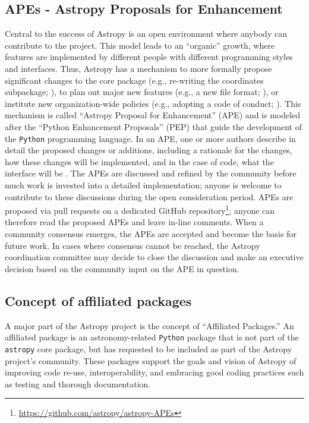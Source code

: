 \documentclass[modern]{aastex62}
\newcommand{\package}[1]{\texttt{#1}\xspace}
\newcommand{\python}{\package{Python}}
\newcommand{\astropy}{Astropy\xspace}
\newcommand{\astropypkg}{\package{astropy}}
\begin{document}
\subsection{APEs - Astropy Proposals for Enhancement}
\label{sect:ape}
Central to the success of \astropy is an open environment where anybody can
contribute to the project.
This model leads to an ``organic'' growth, where features are
implemented by different people with different programming styles and
interfaces.
Thus, \astropy has a mechanism to more formally propose significant changes to
the core package (e.g., re-writing the coordinates subpackage; \citealt{ape5}),
to plan out major new features (e.g., a new file format; \citealt{ape6}), or
institute new organization-wide policies (e.g., adopting a code of conduct;
\citealt{ape8}).
This mechanism is called ``Astropy Proposal for Enhancement'' (APE) and is
modeled after the ``Python Enhancement Proposals'' (PEP) that guide the
development of the \python programming language.
In an APE, one or more authors describe in detail the proposed changes or
additions, including a rationale for the changes, how these changes will be
implemented, and in the case of code, what the interface will be \citep{ape1}.
The APEs are discussed and refined by the community before much work is invested
into a detailed implementation; anyone is welcome to contribute to these
discussions during the open consideration period. APEs are proposed via pull
requests on a dedicated GitHub repository\footnote{\url{https://github.com/astropy/astropy-APEs}};
anyone can therefore read the proposed APEs and leave in-line comments.
When a community consensus emerges, the APEs are accepted and become
the basis for future work.
In cases where consensus cannot be reached, the
\astropy coordination committee may decide to close the discussion and
make an executive decision based on the community input on the APE in question.


\subsection{Concept of affiliated packages}

A major part of the \astropy project is the concept of ``Affiliated Packages.''
An affiliated package is an astronomy-related
\python package that is not part of the \astropypkg core package, but
has requested to be included as part of the \astropy project's
community. These packages support the goals and vision of \astropy of
improving code re-use, interoperability, and embracing good coding
practices such as testing and thorough documentation.
\end{document}
